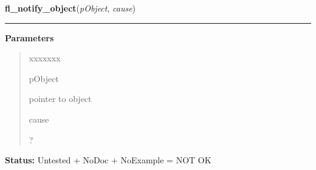 \hspace{.8\funcindent}\begin{boxedminipage}{\funcwidth}

    \raggedright \textbf{fl\_notify\_object}(\textit{pObject}, \textit{cause})

    \vspace{-1.5ex}

    \rule{\textwidth}{0.5\fboxrule}
\setlength{\parskip}{2ex}
\setlength{\parskip}{1ex}
      \textbf{Parameters}
      \vspace{-1ex}

      \begin{quote}
        \begin{Ventry}{xxxxxxx}

          \item[pObject]

          pointer to object

          \item[cause]

          ?

        \end{Ventry}

      \end{quote}

\textbf{Status:} Untested + NoDoc + NoExample = NOT OK



    \end{boxedminipage}

    \label{xformslib:library:fl_set_object_lalign}

    \vspace{0.5ex}

